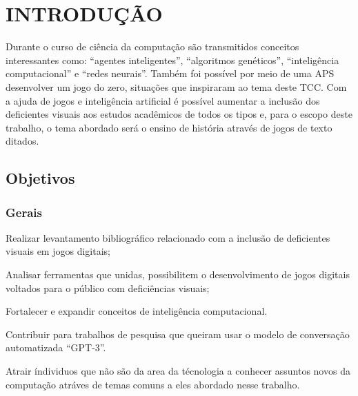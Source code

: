 
\chapter{INTRODUÇÃO}
\label{chap:introducao}

Durante o curso de ciência da computação são transmitidos conceitos interessantes como: “agentes inteligentes”, “algoritmos genéticos”, “inteligência computacional” e “redes neurais”. Também foi possível por meio de uma APS desenvolver um jogo do zero, situações que inspiraram ao tema deste TCC. Com a ajuda de jogos e inteligência artificial é possível aumentar a inclusão dos deficientes visuais aos estudos acadêmicos de todos os tipos e, para o escopo deste trabalho, o tema abordado será o ensino de história através de jogos de texto ditados.

\section{Objetivos}
\label{sec:Objetivos}

\subsection{Gerais}
\label{subsec:Gerais}

\begin{description}
	\setlength\itemindent{15pt}
	\item[•] Realizar levantamento bibliográfico relacionado com a inclusão de deficientes visuais em jogos digitais;

	\item[•] Analisar ferramentas que unidas, possibilitem o desenvolvimento de jogos digitais voltados para o público com deficiências visuais; 

	\item[•] Fortalecer e expandir conceitos de inteligência computacional. 

	\item[•] Contribuir para trabalhos de pesquisa que queiram usar o modelo de conversação automatizada “GPT-3”. 

	\item[•] Atrair índividuos que não são da area da técnologia a conhecer assuntos novos da computação atráves de temas comuns a eles abordado nesse trabalho. 
	
\end{description}  

